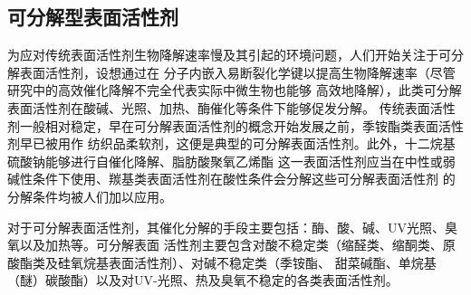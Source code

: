 \documentclass[bachelor,fandolfonts,replaceperiod]{jnuthesis}
\begin{document}
    \subsection{可分解型表面活性剂}
    为应对传统表面活性剂生物降解速率慢及其引起的环境问题，人们开始关注于可分解表面活性剂，设想通过在
    分子内嵌入易断裂化学键以提高生物降解速率（尽管研究中的高效催化降解不完全代表实际中微生物也能够
    高效地降解）\cite{tehrani2007}，此类可分解表面活性剂在酸碱、光照、加热、酶催化等条件下能够促发分解\cite{hellberg2000}。
    传统表面活性剂一般相对稳定，早在可分解表面活性剂的概念开始发展之前，季铵酯类表面活性剂早已被用作
    纺织品柔软剂，这便是典型的可分解表面活性剂。此外，十二烷基硫酸钠能够进行自催化降解、脂肪酸聚氧乙烯酯
    这一表面活性剂应当在中性或弱碱性条件下使用、羰基类表面活性剂在酸性条件会分解这些可分解表面活性剂
    的分解条件均被人们加以应用\cite{tehrani2007}。
    
    对于可分解表面活性剂，其催化分解的手段主要包括：酶、酸、碱、UV光照、臭氧以及加热等。可分解表面
    活性剂主要包含对酸不稳定类（缩醛类、缩酮类、原酸酯类及硅氧烷基表面活性剂）、对碱不稳定类（季铵酯、
    甜菜碱酯、单烷基（醚）碳酸酯）以及对UV-光照、热及臭氧不稳定的各类表面活性剂\cite{hellberg2000,tehrani2007,shukla2010,narayanan2008}。    
%        
%        
%    
\end{document}
